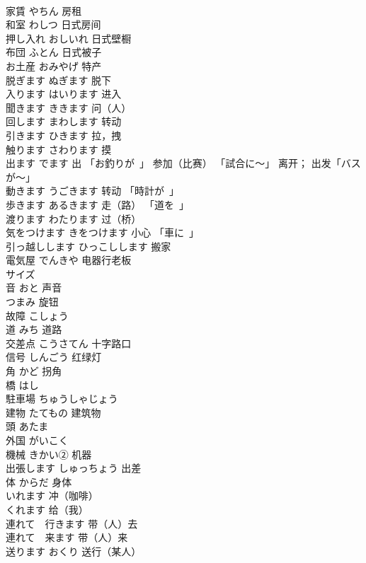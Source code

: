 \documentclass[8pt]{extreport}
\begin{document}
\begin{CJK}{UTF8}{min}
\\	家賃	やちん 房租	
\\	和室	わしつ 日式房间	
\\	押し入れ	おしいれ 日式壁橱	
\\	布団	ふとん 日式被子	
\\	お土産	おみやげ 特产	
\\	脱ぎます	ぬぎます 脱下	
\\	入ります	はいります 进入	
\\	聞きます	ききます 问（人）	
\\	回します	まわします 转动	
\\	引きます	ひきます 拉，拽	
\\	触ります	さわります 摸	
\\	出ます	でます 出 「お釣りが~」 参加（比赛） 「試合に〜」 离开； 出发「バスが〜」	
\\	動きます	うごきます 转动 「時計が~」	
\\	歩きます	あるきます 走（路） 「道を~」	
\\	渡ります	わたります 过（桥）	
\\	気をつけます	きをつけます 小心 「車に~」	
\\	引っ越しします	ひっこしします 搬家	
\\	電気屋	でんきや 电器行老板	
\\	サイズ	
\\	音	おと 声音	
\\	つまみ	旋钮	
\\	故障	こしょう	
\\	道	みち 道路	
\\	交差点	こうさてん 十字路口	
\\	信号	しんごう 红绿灯	
\\	角	かど 拐角	
\\	橋	はし	
\\	駐車場	ちゅうしゃじょう	
\\	建物	たてもの 建筑物	
\\	頭	あたま	
\\	外国	がいこく	
\\	機械	きかい② 机器	
\\	出張します	しゅっちょう 出差	
\\	体	からだ 身体	
\\	いれます	冲（咖啡）	
\\	くれます	给（我）	
\\	連れて　行きます	带（人）去	
\\	連れて　来ます	带（人）来	
\\	送ります	おくり 送行（某人）	

\end{CJK}
\end{document}
